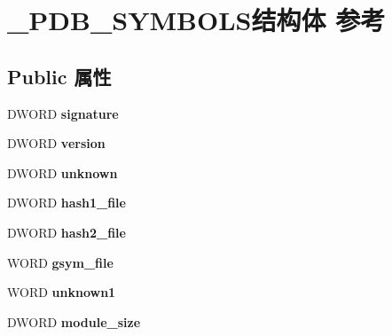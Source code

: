 \hypertarget{struct___p_d_b___s_y_m_b_o_l_s}{}\section{\+\_\+\+P\+D\+B\+\_\+\+S\+Y\+M\+B\+O\+L\+S结构体 参考}
\label{struct___p_d_b___s_y_m_b_o_l_s}
\subsection*{Public 属性}
\begin{DoxyCompactItemize}
\item 
\mbox{\label{struct___p_d_b___s_y_m_b_o_l_s_ae46d87b0dd5d24562d822a50f75950df}} 
D\+W\+O\+RD {\bfseries signature}
\item 
\mbox{\label{struct___p_d_b___s_y_m_b_o_l_s_ad9877bbd1e2a1a975d34d947c2ee2af6}} 
D\+W\+O\+RD {\bfseries version}
\item 
\mbox{\label{struct___p_d_b___s_y_m_b_o_l_s_a9b8f6962788f271e529abeea71ba93ec}} 
D\+W\+O\+RD {\bfseries unknown}
\item 
\mbox{\label{struct___p_d_b___s_y_m_b_o_l_s_a5d712375f3c686fe74803dcc8900b8aa}} 
D\+W\+O\+RD {\bfseries hash1\+\_\+file}
\item 
\mbox{\label{struct___p_d_b___s_y_m_b_o_l_s_a4505bab5415dc1d9d15a1d1270417ea2}} 
D\+W\+O\+RD {\bfseries hash2\+\_\+file}
\item 
\mbox{\label{struct___p_d_b___s_y_m_b_o_l_s_a9f050b390e96ac801dc581d66848d0d3}} 
W\+O\+RD {\bfseries gsym\+\_\+file}
\item 
\mbox{\label{struct___p_d_b___s_y_m_b_o_l_s_a587a00380f25b867f0194c767a1b5d82}} 
W\+O\+RD {\bfseries unknown1}
\item 
\mbox{\label{struct___p_d_b___s_y_m_b_o_l_s_af1914deeef665c27b8589ae5f9dcd683}} 
D\+W\+O\+RD {\bfseries module\+\_\+size}
\item 

\end{DoxyCompactItemize}
